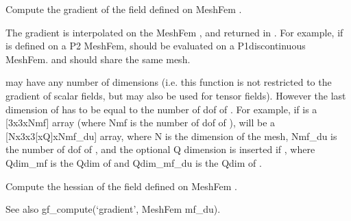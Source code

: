 \documentclass[a4paper,11pt,english]{sphinxmanual}
\begin{document}
\begin{fulllineitems}
\label{\detokenize{python/cmdref_Module compute:getfem.compute_gradient}}
Compute the gradient of the field  defined on MeshFem .

The gradient is interpolated on the MeshFem , and returned in
. For example, if  is defined on a P2 MeshFem,  should be
evaluated on a P1\sphinxhyphen{}discontinuous MeshFem.  and  should
share the same mesh.

 may have any number of dimensions (i.e. this function is not
restricted to the gradient of scalar fields, but may also be used
for tensor fields). However the last dimension of  has to be
equal to the number of dof of . For example, if  is a
{[}3x3xNmf{]} array (where Nmf is the number of dof of ),  will
be a {[}Nx3x3{[}xQ{]}xNmf\_du{]} array, where N is the dimension of the mesh,
Nmf\_du is the number of dof of , and the optional Q dimension
is inserted if , where Qdim\_mf is the Qdim of
 and Qdim\_mf\_du is the Qdim of .

\end{fulllineitems}


\begin{fulllineitems}
\label{\detokenize{python/cmdref_Module compute:getfem.compute_hessian}}
Compute the hessian of the field  defined on MeshFem .

See also gf\_compute(‘gradient’, MeshFem mf\_du).

\end{fulllineitems}

\end{document}
